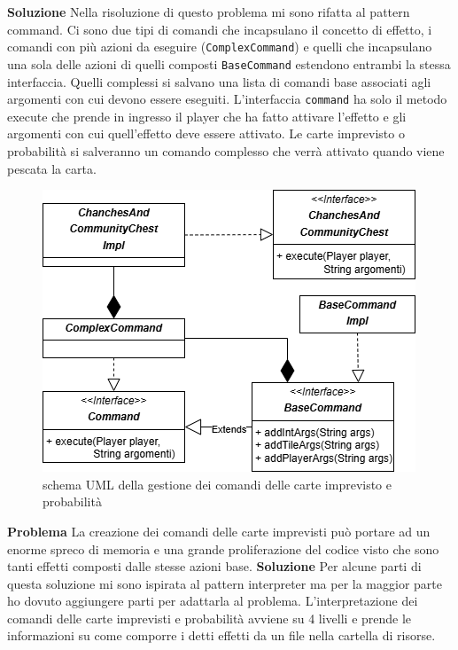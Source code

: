 \textbf{Soluzione}\newline
Nella risoluzione di questo problema mi sono rifatta al pattern command. Ci sono due tipi di comandi che incapsulano il concetto di effetto, i comandi con più azioni da eseguire (\texttt{ComplexCommand}) e quelli che incapsulano una sola delle azioni di quelli composti \texttt{BaseCommand} estendono entrambi la stessa interfaccia. Quelli complessi  si salvano una lista di comandi base associati agli argomenti con cui devono essere eseguiti. 
L’interfaccia \texttt{command} ha solo il metodo execute che prende in ingresso il player che ha fatto attivare l’effetto e gli argomenti con cui quell’effetto deve essere attivato. 
Le carte imprevisto o probabilità si salveranno un comando complesso che verrà attivato quando viene pescata la carta.
\begin{figure}[h]
    \centering
    \includegraphics[width=0.75\linewidth]{img/martina/commandsUML.png}
    \caption{schema UML della gestione dei comandi delle carte imprevisto e probabilità}
    \label{img:commandsUML}
\end{figure}
\newline\newline
\textbf{Problema}\newline
La creazione dei comandi delle carte imprevisti può portare ad un enorme spreco di memoria e una grande proliferazione del codice visto che sono tanti effetti composti dalle stesse azioni base.  \newline\newline
\textbf{Soluzione}\newline
Per alcune parti di questa soluzione mi sono ispirata al pattern interpreter ma per la maggior parte ho dovuto aggiungere parti per adattarla al problema. 
L’interpretazione dei comandi delle carte imprevisti e probabilità avviene su 4 livelli e prende le informazioni su come comporre i detti effetti da un file nella cartella di risorse. 
